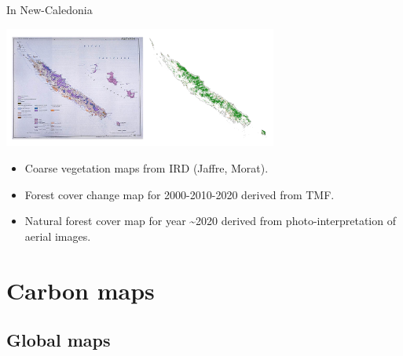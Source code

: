 \documentclass[10pt,table,dvipsnames,compress]{beamer}
\begin{document}
\begin{frame}[label={sec:org31706ad}]{In New-Caledonia}
\begin{center}
\includegraphics[width=9cm]{figs/fcc/fcc_nc.png}
\end{center}

\begin{itemize}
\item Coarse vegetation maps from IRD (Jaffre, Morat).
\item Forest cover change map for 2000-2010-2020 derived from TMF.
\item Natural forest cover map for year \textasciitilde{}2020 derived from photo-interpretation of aerial images.
\end{itemize}
\end{frame}

\section{Carbon maps}
\label{sec:org53e981f}

\subsection{Global maps}
\label{sec:org130e9a4}
\end{document}

